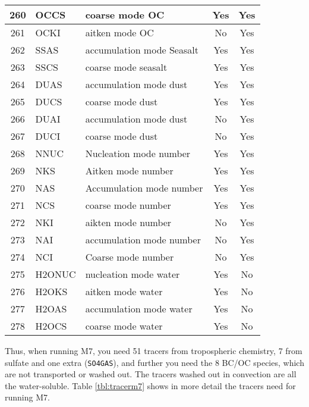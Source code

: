 \begin{table*}
\begin{minipage}{\linewidth}
\begin{tabular}{|c|l|l|c|c|}
\hline
260 & OCCS       &    coarse mode OC        &  Yes       &  Yes\\
\hline
261 & OCKI       &    aitken mode OC        &  No        &  Yes\\
\hline
262 & SSAS       & accumulation mode Seasalt &  Yes      &  Yes\\
\hline
263 & SSCS       &  coarse mode seasalt      &  Yes      &  Yes\\
\hline
264 & DUAS       &    accumulation mode dust  &  Yes     &  Yes\\
\hline
265 & DUCS       &    coarse mode dust        &  Yes     &  Yes\\
\hline
266 & DUAI       &    accumulation mode dust  &  No      &  Yes\\
\hline
267 & DUCI       &   coarse mode dust        &  No       &  Yes\\
\hline
268 & NNUC       &    Nucleation mode number &  Yes      &  Yes\\
\hline
269 & NKS        &    Aitken mode number      &  Yes     &  Yes\\
\hline
270 & NAS        &    Accumulation mode number  &  Yes   &  Yes\\
\hline 
271 & NCS        &   coarse mode number        &  Yes    &  Yes\\
\hline
272 & NKI        &   aikten mode number      &  No       &  Yes\\
\hline
273 & NAI        &    accumulation mode number  &  No    &  Yes\\
\hline
274 & NCI        &   Coarse mode number         & No     &  Yes\\
\hline
275 & H2ONUC     &   nucleation mode water      &  Yes   &  No\\
\hline
276 & H2OKS      &  aitken mode water           &  Yes   &  No \\
\hline
277 & H2OAS      &  accumulation mode water     & Yes    &  No\\
\hline
278 & H2OCS      &  coarse mode water           & Yes    &  No \\
\hline
\end{tabular}
\end{minipage}
\end{table*}

Thus, when running M7, you need 51 tracers from tropospheric
chemistry, 7 from sulfate and one extra (\verb#SO4GAS#), and further
you need the 8 BC/OC species, which are not transported or washed
out. The tracers washed out in convection are all the
water-soluble. Table \ref{tbl:tracerm7} shows in more detail the
tracers need for running M7.


